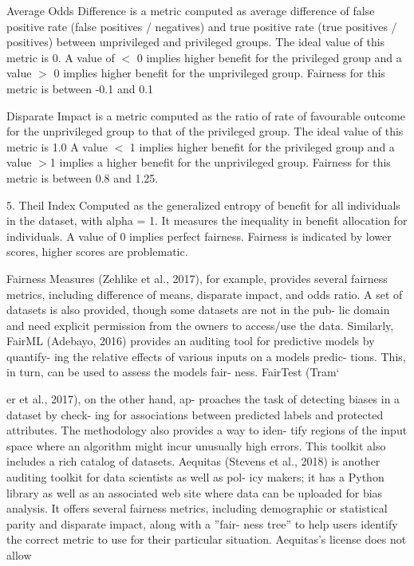 \documentclass[sigconf,review]{acmart}
\begin{document}
Average Odds Difference \cite{bellamy2018ai} is a metric computed as average difference of false positive rate (false positives / negatives) and true positive rate (true positives / positives) between unprivileged and privileged groups.
The ideal value of this metric is 0. A value of $<$ 0 implies higher benefit for the privileged group and a value $>$ 0 implies higher benefit for the unprivileged group.
Fairness for this metric is between -0.1 and 0.1

Disparate Impact \cite{feldman2015disparate,bellamy2018ai} is a metric computed as the ratio of rate of favourable outcome for the unprivileged group to that of the privileged group.
The ideal value of this metric is 1.0 A value $<$ 1 implies higher benefit for the privileged group and a value $>$1 implies a higher benefit for the unprivileged group.
Fairness for this metric is between 0.8 and 1.25.

5. Theil Index \cite{conceicao2000theyoung,bellamy2018ai}
Computed as the generalized entropy of benefit for all individuals in the dataset, with alpha = 1. It measures the inequality in benefit allocation for individuals.
A value of 0 implies perfect fairness. Fairness is indicated by lower scores, higher scores are problematic.


Fairness Measures (Zehlike et al., 2017), for example,
provides several fairness metrics, including difference of
means, disparate impact, and odds ratio. A set of datasets
is also provided, though some datasets are not in the pub-
lic domain and need explicit permission from the owners
to access/use the data. Similarly, FairML (Adebayo, 2016)
provides an auditing tool for predictive models by quantify-
ing the relative effects of various inputs on a models predic-
tions. This, in turn, can be used to assess the models fair-
ness. FairTest (Tram`

er et al., 2017), on the other hand, ap-
proaches the task of detecting biases in a dataset by check-
ing for associations between predicted labels and protected
attributes. The methodology also provides a way to iden-
tify regions of the input space where an algorithm might
incur unusually high errors. This toolkit also includes a
rich catalog of datasets. Aequitas (Stevens et al., 2018) is
another auditing toolkit for data scientists as well as pol-
icy makers; it has a Python library as well as an associated
web site where data can be uploaded for bias analysis. It
offers several fairness metrics, including demographic or
statistical parity and disparate impact, along with a ”fair-
ness tree” to help users identify the correct metric to use for
their particular situation. Aequitas’s license does not allow
\end{document}
